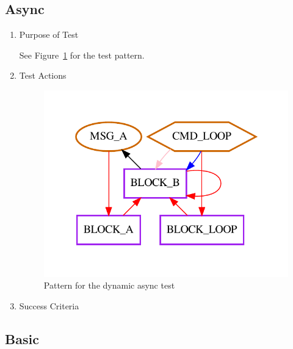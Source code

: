 \documentclass[12pt,a4paper]{report}
\begin{document}
\subsection{Async}
\begin{enumerate}
	\item Purpose of Test

	See Figure~\ref{fig:Pattern_for_the_dynamic_async_test} for the test pattern.
	\item Test Actions
    \begin{figure}
        \centering 
        \includegraphics{TestPattern/dynamic_async.pdf}
        \caption{Pattern for the dynamic async test}
        \label{fig:Pattern_for_the_dynamic_async_test}
    \end{figure}
	\item Success Criteria
\end{enumerate}
\subsection{Basic}
\end{document}
